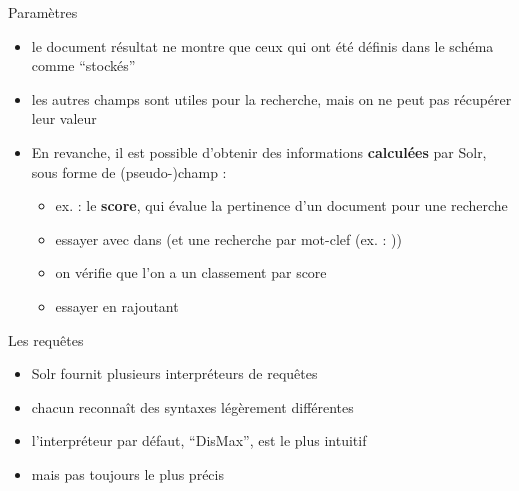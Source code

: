 \begin{frame}{Paramètres}
\begin{itemize}
  \item le document résultat ne montre que ceux qui ont été définis dans le
    schéma comme ``stockés''
  \item les autres champs sont utiles pour la recherche, mais on ne peut pas
    récupérer leur valeur
  \item En revanche, il est possible d'obtenir des informations {\bf calculées} par
    Solr, sous forme de (pseudo-)champ :
    \begin{itemize}
      \item  ex. : le {\bf score}, qui évalue la pertinence d'un document pour une
        recherche
      \item essayer avec  dans  (et une recherche
        par mot-clef (ex. : ))
      \item on vérifie que l'on a un classement par score
      \item essayer en rajoutant \variable{[explain style=nl]}
    \end{itemize}
  
\end{itemize}
\end{frame}
  
\begin{frame}[fragile]{Les requêtes}
  \begin{itemize}
      \setlength{\itemsep}{10pt}
    \item Solr fournit plusieurs interpréteurs de requêtes
    \item  chacun reconnaît des syntaxes légèrement différentes
    \item l'interpréteur par défaut, ``DisMax'', est le plus intuitif
    \item mais pas toujours le plus précis 
  \end{itemize}

\end{frame}

